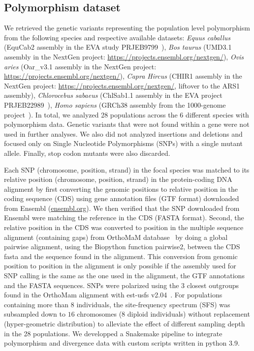 \documentclass{article}
\begin{document}
    \subsection{Polymorphism dataset}
    \label{subsec:polymorphism-dataset}

    We retrieved the genetic variants representing the population level polymorphism from the following species and respective available datasets: \textit{Equus caballus} (EquCab2 assembly in the EVA study PRJEB9799~\cite{alabri_whole_2020}), \textit{Bos taurus} (UMD3.1 assembly in the NextGen project: \url{https://projects.ensembl.org/nextgen/}), \textit{Ovis aries} (Oar\_v3.1 assembly in the NextGen project: \url{https://projects.ensembl.org/nextgen/}), \textit{Capra Hircus} (CHIR1 assembly in the NextGen project: \url{https://projects.ensembl.org/nextgen/}, liftover to the ARS1 assembly), \textit{Chlorocebus sabaeus} (ChlSab1.1 assembly in the EVA project PRJEB22989~\cite{svardal_ancient_2017}), \textit{Homo sapiens} (GRCh38 assembly from the 1000-genome project~\cite{consortium_integrated_2012a, the1000genomesprojectconsortium_global_2015}).
    In total, we analyzed 28 populations across the 6 different species with polymorphism data.
    Genetic variants that were not found within a gene were not used in further analyses.
    We also did not analyzed insertions and deletions and focused only on Single Nucleotide Polymorphisms (SNPs) with a single mutant allele.
    Finally, stop codon mutants were also discarded.

    Each SNP (chromosome, position, strand) in the focal species was matched to its relative position (chromosome, position, strand) in the protein-coding DNA alignment by first converting the genomic positions to relative position in the coding sequence (CDS) using gene annotation files (GTF format) downloaded from Ensembl (\url{ensembl.org}).
    We then verified that the SNP downloaded from Ensembl were matching the reference in the CDS (FASTA format).
    Second, the relative position in the CDS was converted to position in the multiple sequence alignment (containing gaps) from OrthoMaM database~\cite{ranwez_orthomam_2007, douzery_orthomam_2014, scornavacca_orthomam_2019} by doing a global pairwise alignment, using the Biopython function pairwise2, between the CDS fasta and the sequence found in the alignment.
    This conversion from genomic position to position in the alignment is only possible if the assembly used for SNP calling is the same as the one used in the alignment, the GTF annotations and the FASTA sequences.
    SNPs were polarized using the $3$ closest outgroups found in the OrthoMam alignment with est-usfs v2.04~\cite{keightley_inferring_2018}.
    For populations containing more than $8$ individuals, the site-frequency spectrum (SFS) was subsampled down to $16$ chromosomes ($8$ diploid individuals) without replacement (hyper-geometric distribution) to alleviate the effect of different sampling depth in the 28 populations.
    We developped a Snakemake pipeline to integrate polymorphism and divergence data with custom scripts written in python 3.9.
\end{document}
